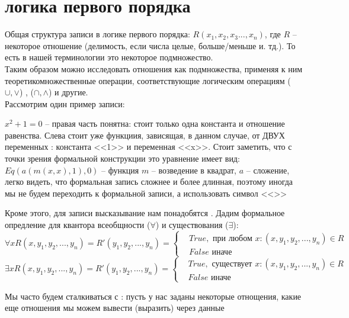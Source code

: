 \section{логика первого порядка}
Общая структура записи в логике первого порядка: $R(x_1 , x_2, x_3 ... , x_n)$, где $R$ -- некоторое отношение (делимость, если числа целые, больше/меньше и. тд.). То есть  в нашей терминологии это некоторое подмножество. \\
Таким образом можно исследовать отношения как подмножества, применяя к ним теоретикомножественные операции, соответствующие логическим операциям ($\cup, \lor$) , ($\cap , \land$) и другие. \\
Рассмотрим один пример записи:
\begin{example}
$x^2 + 1 =  0$ -- правая часть понятна: стоит только одна константа и отношение равенства. Слева стоит уже функциия, зависящая, в данном случае, от ДВУХ переменных : константа <<1>> и переменная <<x>>. Стоит заметить, что с точки зрения формальной конструкции это уравнение имеет вид: $Eq (a( m(x, x), 1), 0)$ -- функция $m$ -- возведение в квадрат, $a$ -- сложение, легко видеть, что формальная запись сложнее и более длинная, поэтому иногда мы не будем переходить к формальной записи, а использовать символ <<>>
\end{example}
Кроме этого, для записи высказывание нам понадобятся . Дадим формальное опредление для квантора всеобщности ($\forall$) и существования ($\exists$):
\begin{equation}
    \forall x R(x, y_1, y_2, ... , y_n) = R'(y_1 , y_2, ... , y_n) =  \left\{ \begin{aligned} 
                       & True , \text{ при любом } x : (x, y_1,y_2,... , y_n) \in R \\
                        & False \text { иначе}
             \end{aligned} \right.
\end{equation}
\begin{equation}
    \exists x R(x, y_1, y_2, ... , y_n) = R'(y_1 , y_2, ... , y_n) =  \left\{ \begin{aligned} 
                       & True , \text{ существует } x : (x, y_1,y_2,... , y_n) \in R \\
                        & False \text { иначе}
             \end{aligned} \right.
\end{equation}

Мы часто будем сталкиваться с  : пусть у нас заданы некоторые отнощения, какие еще отношения мы можем вывести (выразить) через данные

